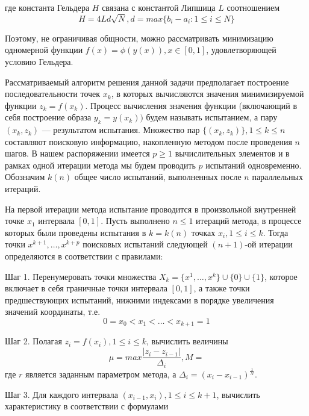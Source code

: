 где константа Гельдера \(H\) связана с константой Липшица \(L\) соотношением 
\begin{equation}
H=4Ld\sqrt{N},d=max\{b_i-a_i:1\leqslant i\leqslant N\}
\end{equation}
\par
Поэтому, не ограничивая общности, можно рассматривать минимизацию одномерной функции  \(f(x)=\phi(y(x)), x\in[0,1]\), удовлетворяющей условию Гельдера.
\par
Рассматриваемый алгоритм решения данной задачи предполагает построение последовательности точек \(x_k\), в которых вычисляются значения минимизируемой функции \(z_k = f(x_k)\). Процесс вычисления значения функции (включающий в себя построение образа \(y_k=y(x_k))\) будем называть испытанием, а пару \((x_k,z_k)\) --- результатом испытания. Множество пар \(\{(x_k,z_k)\}, 1\leqslant k\leqslant n\) составляют поисковую информацию, накопленную методом после проведения \(n\) шагов. В нашем распоряжении имеется \(p\geqslant 1\) вычислительных элементов и в рамках одной итерации метода мы будем проводить \(p\) испытаний одновременно. Обозначим \(k(n)\) общее число испытаний, выполненных после \(n\) параллельных итераций.
\par
На первой итерации метода испытание проводится в произвольной внутренней точке \(x_1\) интервала \([0,1]\). Пусть выполнено \(n\leqslant 1\) итераций метода, в процессе которых были проведены испытания в \(k = k(n)\) точках \(x_i, 1\leqslant i\leqslant k\). Тогда точки \(x^{k+1},\dotsc,x^{k+p}\) поисковых испытаний следующей \((n+1)\)-ой итерации определяются в соответствии с правилами:
\par
Шаг 1. Перенумеровать точки множества \(X_k=\{x^1,\dotsc,x^k\}\cup\{0\}\cup\{1\}\), которое включает в себя граничные точки интервала \([0,1]\), а также точки предшествующих испытаний, нижними индексами в порядке увеличения значений координаты, т.е.
\begin{equation}
0=x_0<x_1<\dotsc<x_{k+1}=1
\end{equation}
\par
Шаг 2. Полагая \(z_i=f(x_i),1\leqslant i\leqslant k\), вычислить величины 
\begin{equation}
\label{step2}
\mu=max\dfrac{|z_i-z_{i-1}|}{\Delta_i}, M=
\end{equation}
где \(r\) является заданным параметром метода, а \(\Delta_i=(x_i-x_{i-1})^\frac{1}{N}\).
\par
Шаг 3. Для каждого интервала \((x_{i-1},x_i),1\leqslant i\leqslant k+1\), вычислить характеристику в соответствии с формулами
